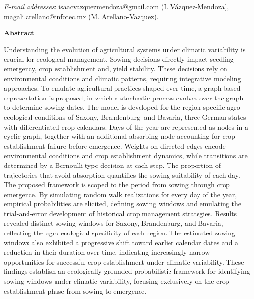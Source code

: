 \documentclass[10pt,authoryear]{elsarticle}
\begin{document}
	

	{\color{black}
		\iffalse
		\textit{E-mail addresses}: \url{isaacvazquezmendoza@gmail.com} (I. Vázquez-Mendoza), \url{magali.arellano@infotec.mx} (M. Arellano-Vazquez).
	
		
		\bigskip
		
		{\color{black}
			\textbf{Abstract}}
		
		{\color{black}
			
			Understanding the evolution of agricultural systems under climatic variability is crucial for ecological management. Sowing decisions directly impact seedling emergency, crop establishment and, yield stability. These decisions rely on environmental conditions and climatic patterns, requiring integrative modeling approaches.
			To emulate agricultural practices shaped over time, a graph-based representation is proposed, in which a stochastic process evolves over the graph to determine sowing dates. The model is developed for the region-specific agro ecological conditions of Saxony, Brandenburg, and Bavaria, three German states with differentiated crop calendars.
			Days of the year are represented as nodes in a cyclic graph, together with an additional absorbing node accounting for crop establishment failure before emergence. Weights on directed edges encode environmental conditions and crop establishment dynamics, while transitions are determined by a Bernoulli-type decision at each step. The proportion of trajectories that avoid absorption quantifies the sowing suitability of each day.
			The proposed framework is scoped to the period from sowing through crop emergence. By simulating random walk realizations for every day of the year, empirical probabilities are elicited, defining sowing windows and emulating the trial-and-error development of historical crop management strategies.
			Results revealed distinct sowing windows for Saxony, Brandenburg, and Bavaria, reflecting the agro ecological specificity of each region. The estimated sowing windows also exhibited a progressive shift toward earlier calendar dates and a reduction in their duration over time, indicating increasingly narrow opportunities for successful crop establishment under climatic variability.
			These findings establish an ecologically grounded probabilistic framework for identifying sowing windows under climatic variability, focusing exclusively on the crop establishment phase from sowing to emergence.
			
}}
\end{document}
